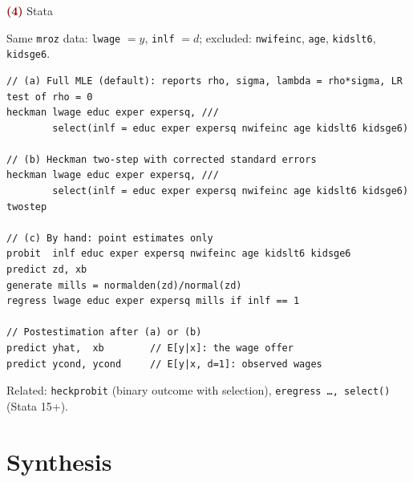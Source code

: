 \documentclass[aspectratio=169,11pt]{beamer}
\newcommand{\Part}[1]{\textcolor{DarkRed}{\textbf{(#1)}}}
\begin{document}
\begin{frame}[fragile]{\Part{4} Stata}

Same \texttt{mroz} data: \texttt{lwage} $=y$, \texttt{inlf} $=d$; excluded:
\texttt{nwifeinc}, \texttt{age}, \texttt{kidslt6}, \texttt{kidsge6}.

\begin{lstlisting}[style=stata]
// (a) Full MLE (default): reports rho, sigma, lambda = rho*sigma, LR test of rho = 0
heckman lwage educ exper expersq, ///
        select(inlf = educ exper expersq nwifeinc age kidslt6 kidsge6)

// (b) Heckman two-step with corrected standard errors
heckman lwage educ exper expersq, ///
        select(inlf = educ exper expersq nwifeinc age kidslt6 kidsge6) twostep

// (c) By hand: point estimates only
probit  inlf educ exper expersq nwifeinc age kidslt6 kidsge6
predict zd, xb
generate mills = normalden(zd)/normal(zd)
regress lwage educ exper expersq mills if inlf == 1

// Postestimation after (a) or (b)
predict yhat,  xb        // E[y|x]: the wage offer
predict ycond, ycond     // E[y|x, d=1]: observed wages
\end{lstlisting}

\vspace{-0.2em}
\footnotesize
Related: \texttt{heckprobit} (binary outcome with selection),
\texttt{eregress \ldots, select()} (Stata 15+).

\end{frame}

\section{Synthesis}
\end{document}
